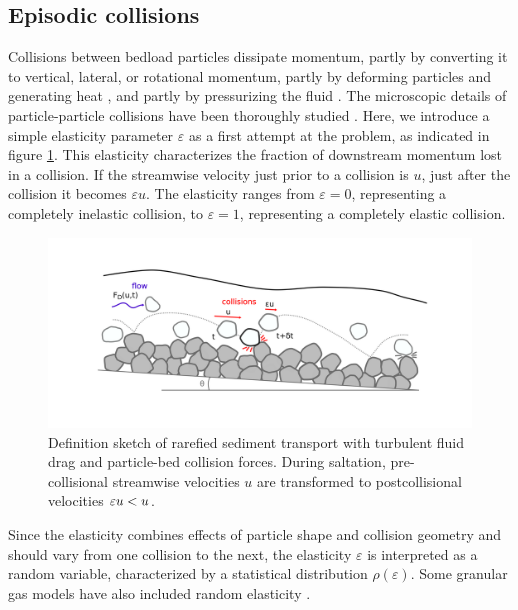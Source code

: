 \subsection{Episodic collisions}
Collisions between bedload particles dissipate momentum, partly by converting it to vertical, lateral, or rotational momentum, partly by deforming particles and generating heat \citep{Schmeeckle2014,Williams2021}, and partly by pressurizing the fluid \citep{Joseph2001,Schmeeckle2001}. 
The microscopic details of particle-particle collisions have been thoroughly studied \citep{Brach1989, Lorenz1997,Montaine2011}. Here, we introduce a simple elasticity parameter $\varepsilon$ as a first attempt at the problem, as indicated in figure \ref{fig:fig1}. This elasticity characterizes the fraction of downstream momentum lost in a collision. If the streamwise velocity just prior to a collision is $u$, just after the collision it becomes $\varepsilon u$. The elasticity ranges from $\varepsilon=0$, representing a completely inelastic collision, to $\varepsilon=1$, representing a completely elastic collision.
\begin{figure}
	\centerline{\includegraphics{./figures/ch5/Fig1Concept.png}}
	\caption{Definition sketch of rarefied sediment transport with turbulent fluid drag and particle-bed collision forces. During saltation, pre-collisional streamwise velocities $u$ are transformed to postcollisional velocities $\varepsilon u < u$.}
	\label{fig:fig1}
\end{figure}

Since the elasticity combines effects of particle shape and collision geometry and should vary from one collision to the next, the elasticity $\varepsilon$ is interpreted as a random variable, characterized by a statistical distribution $\rho(\varepsilon)$.
Some granular gas models have also included random elasticity \citep[e.g.][]{Serero2015}.

